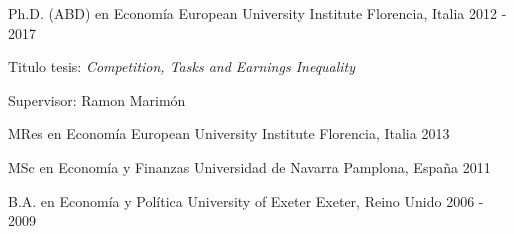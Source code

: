 

\begin{cventries}

  \cventry
    {Ph.D. (ABD) en Economía} %
    {European University Institute} %
    {Florencia, Italia} %
    {2012 - 2017} %
    {
        \begin{cvitems} %
            \item {Titulo tesis: \textit{Competition, Tasks and Earnings Inequality}}
            \item {Supervisor: Ramon Marimón}
        \end{cvitems}
    }

\cventry
    {MRes en Economía} %
    {European University Institute} %
    {Florencia, Italia} %
    {2013} %
    {}

\cventry
    {MSc en Economía y Finanzas} %
    {Universidad de Navarra} %
    {Pamplona, España} %
    {2011} %
    {}

\cventry
    {B.A. en Economía y Política} %
    {University of Exeter} %
    {Exeter, Reino Unido} %
    {2006 - 2009} %
    {}

\end{cventries}

